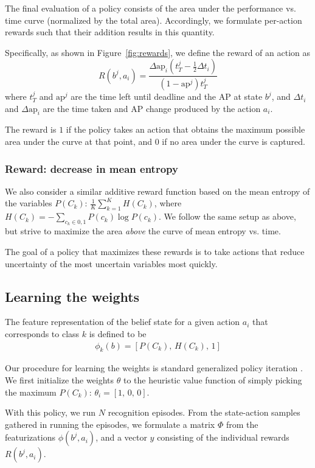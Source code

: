 The final evaluation of a policy consists of the area under the performance vs. time curve (normalized by the total area).
Accordingly, we formulate per-action rewards such that their addition results in this quantity.

Specifically, as shown in Figure~\ref{fig:rewards}, we define the reward of an action as
\begin{equation}\label{eq:advanced}
R(b^j,a_i) = \frac{\Delta \text{ap}_i (t_T^j-\frac{1}{2}\Delta t_i)}{(1-\text{ap}^j)t_T^j}
\end{equation}
where $t_T^j$ and $\text{ap}^j$ are the time left until deadline and the AP at state $b^j$, and $\Delta t_i$ and $\Delta \text{ap}_i$ are the time taken and AP change produced by the action $a_i$.

The reward is $1$ if the policy takes an action that obtains the maximum possible area under the curve at that point, and $0$ if no area under the curve is captured.

\subsubsection{Reward: decrease in mean entropy}
We also consider a similar additive reward function based on the mean entropy of the variables $P(C_k)$: $\frac{1}{K}\sum_{k=1}^K H(C_k)$, where $H(C_k) = - \sum_{c_k \in {0,1}} P(c_k) \log P(c_k)$.
We follow the same setup as above, but strive to maximize the area \emph{above} the curve of mean entropy vs. time.

The goal of a policy that maximizes these rewards is to take actions that reduce uncertainty of the most uncertain variables most quickly.

\subsection{Learning the weights}

The feature representation of the belief state for a given action $a_i$ that corresponds to class $k$ is defined to be
\begin{align}
\phi_k(b) = [P(C_k), \, H(C_k), \, 1]
\end{align}

Our procedure for learning the weights is standard generalized policy iteration \cite{Sutton1998}.
We first initialize the weights $\theta$ to the heuristic value function of simply picking the maximum $P(C_k)$: $\theta_i = [1, \,0, \,0]$.

With this policy, we run $N$ recognition episodes.
From the state-action samples gathered in running the episodes, we formulate a matrix $\Phi$ from the featurizations $\phi(b^j,a_i)$, and a vector $y$ consisting of the individual rewards $R(b^j,a_i)$.

